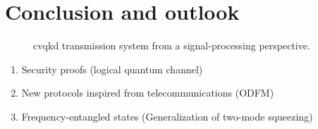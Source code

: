 \chapter*{Conclusion and outlook}


\begin{figure}[htb]
	\centering
	\caption{\Gls{cvqkd} transmission system from a signal-processing perspective.}
\end{figure}


\begin{enumerate}
	\item Security proofs (logical quantum channel)
	\item New protocols inspired from telecommunications (ODFM)
	\item Frequency-entangled states (Generalization of two-mode squeezing)
\end{enumerate}